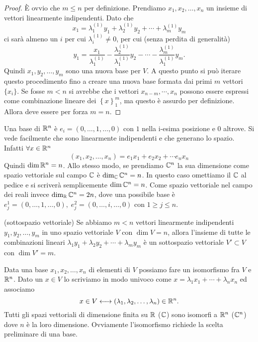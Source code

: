 \begin{proof}
È ovvio che $m \leq n$ per definizione. Prendiamo $x_1, x_2, \ldots, x_n$ un insieme di vettori linearmente indipendenti. Dato che 
\begin{equation*}
x_1 = \lambda_1^{(1)} y_1 + \lambda_2^{(1)} y_2 + \cdots + \lambda_m^{(1)} y_m
\end{equation*}
ci sarà almeno un $i$ per cui $\lambda_i^{(1)} \neq 0$, per cui (senza perdita di generalità)
\begin{equation*}
y_1 = \frac{x_1}{\lambda_1^{(1)}} - \frac{\lambda_2^{(1)}}{\lambda_1^{(1)}} y_2 - \cdots - \frac{\lambda_m^{(1)}}{\lambda_1^{(1)}} y_m.
\end{equation*} 
Quindi $x_1, y_2, \ldots , y_m$ sono una nuova base per $V$. A questo punto si può iterare questo procedimento fino a creare una nuova base formata dai primi $m$ vettori $\{x_i\}$. Se fosse $m < n$ si avrebbe che i vettori $x_{n-m},\cdots,x_n$ possono essere espressi come combinazione lineare dei $\left\lbrace x \right\rbrace^m_1$, ma questo è assurdo per definizione. Allora deve essere per forza $m=n$. 
\end{proof}

Una base di $\mathbb R^n$ è $e_i = (0, \ldots, 1, \ldots,0)$ con $1$ nella i-esima posizione e $0$ altrove. Si vede facilmente che sono linearmente indipendenti e che generano lo spazio. Infatti $\forall x \in \mathbb R^n$ 
\begin{equation*}
(x_1, x_2, \ldots, x_n) = e_1 x_1 + e_2 x_2 + \cdots e_n x_n
\end{equation*}
Quindi $\dim{\mathbb R^n} = n$. Allo stesso modo, se prendiamo $\mathbb C^n$ la sua dimensione come spazio vettoriale sul campo $\mathbb C$ è $\dim_\mathbb C{\mathbb C^n} = n$. In questo caso omettiamo il $ \mathbb C$ al pedice e si scriverà semplicemente $\dim{\mathbb C^n} =  n$. Come spazio vettoriale nel campo dei reali invece $\dim_\mathbb R{\mathbb C^n} = 2n$, dove una possibile base è $e_j^1 = (0,\ldots,1,\ldots,0), \; e_j^2 = (0,\ldots,i,\ldots,0)$ con $1 \geq j \leq n$. 

\begin{definition}{(sottospazio vettoriale)}
Se abbiamo $m<n$ vettori linearmente indipendenti $y_1, y_2, \ldots , y_m$ in uno spazio vettoriale $V$ con $\dim	{V} = n$, allora l'insieme di tutte le combinazioni lineari $\lambda_1 y_1 + \lambda_2 y_2 + \cdots + \lambda_m y_m$ è un sottospazio vettoriale $V' \subset V$ con $\dim{V'} = m$.
\end{definition}

Data una base $x_1, x_2, \ldots, x_n$ di elementi di $V$ possiamo fare un isomorfismo fra $V$ e $\mathbb R^n$. Dato un $x \in V$ lo scriviamo in modo univoco come $x = \lambda_1 x_1+\cdots+\lambda_nx_n$ ed associamo 
\begin{equation*}
x \in V \longleftrightarrow (\lambda_1, \lambda_2, \ldots, \lambda_n) \in \mathbb R^n.
\end{equation*}
Tutti gli spazi vettoriali di dimensione finita su $\mathbb R$ ($\mathbb C$) sono isomorfi a $\mathbb R^n$ ($\mathbb C^n$) dove $n$ è la loro dimensione. Ovviamente l'isomorfismo richiede la scelta preliminare di una base.

